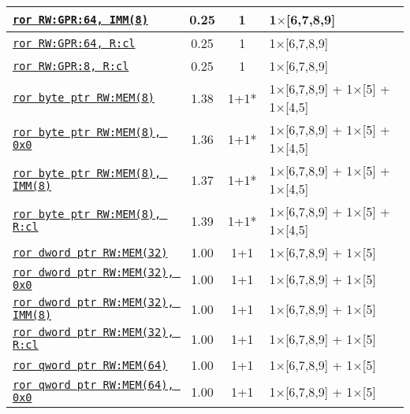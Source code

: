 \documentclass[a4paper,english,fontsize=9]{scrartcl}
\begin{document}
\begin{longtable}{p{}ccL{.25\textwidth}}
  \midrule
  \texttt{\href{https://felixcloutier.com/x86/RCL:RCR:ROL:ROR.html}{ror RW:GPR:64, IMM(8)}} & 0.25 & 1 & 1\(\times\)[6,7,8,9] \\
  \midrule
  \texttt{\href{https://felixcloutier.com/x86/RCL:RCR:ROL:ROR.html}{ror RW:GPR:64, R:cl}} & 0.25 & 1 & 1\(\times\)[6,7,8,9] \\
  \midrule
  \texttt{\href{https://felixcloutier.com/x86/RCL:RCR:ROL:ROR.html}{ror RW:GPR:8, R:cl}} & 0.25 & 1 & 1\(\times\)[6,7,8,9] \\
  \midrule
  \texttt{\href{https://felixcloutier.com/x86/RCL:RCR:ROL:ROR.html}{ror byte ptr RW:MEM(8)}} & 1.38 & 1+1* & 1\(\times\)[6,7,8,9] + 1\(\times\)[5] + 1\(\times\)[4,5] \\
  \midrule
  \texttt{\href{https://felixcloutier.com/x86/RCL:RCR:ROL:ROR.html}{ror byte ptr RW:MEM(8), 0x0}} & 1.36 & 1+1* & 1\(\times\)[6,7,8,9] + 1\(\times\)[5] + 1\(\times\)[4,5] \\
  \midrule
  \texttt{\href{https://felixcloutier.com/x86/RCL:RCR:ROL:ROR.html}{ror byte ptr RW:MEM(8), IMM(8)}} & 1.37 & 1+1* & 1\(\times\)[6,7,8,9] + 1\(\times\)[5] + 1\(\times\)[4,5] \\
  \midrule
  \texttt{\href{https://felixcloutier.com/x86/RCL:RCR:ROL:ROR.html}{ror byte ptr RW:MEM(8), R:cl}} & 1.39 & 1+1* & 1\(\times\)[6,7,8,9] + 1\(\times\)[5] + 1\(\times\)[4,5] \\
  \midrule
  \texttt{\href{https://felixcloutier.com/x86/RCL:RCR:ROL:ROR.html}{ror dword ptr RW:MEM(32)}} & 1.00 & 1+1 & 1\(\times\)[6,7,8,9] + 1\(\times\)[5] \\
  \midrule
  \texttt{\href{https://felixcloutier.com/x86/RCL:RCR:ROL:ROR.html}{ror dword ptr RW:MEM(32), 0x0}} & 1.00 & 1+1 & 1\(\times\)[6,7,8,9] + 1\(\times\)[5] \\
  \midrule
  \texttt{\href{https://felixcloutier.com/x86/RCL:RCR:ROL:ROR.html}{ror dword ptr RW:MEM(32), IMM(8)}} & 1.00 & 1+1 & 1\(\times\)[6,7,8,9] + 1\(\times\)[5] \\
  \midrule
  \texttt{\href{https://felixcloutier.com/x86/RCL:RCR:ROL:ROR.html}{ror dword ptr RW:MEM(32), R:cl}} & 1.00 & 1+1 & 1\(\times\)[6,7,8,9] + 1\(\times\)[5] \\
  \midrule
  \texttt{\href{https://felixcloutier.com/x86/RCL:RCR:ROL:ROR.html}{ror qword ptr RW:MEM(64)}} & 1.00 & 1+1 & 1\(\times\)[6,7,8,9] + 1\(\times\)[5] \\
  \midrule
  \texttt{\href{https://felixcloutier.com/x86/RCL:RCR:ROL:ROR.html}{ror qword ptr RW:MEM(64), 0x0}} & 1.00 & 1+1 & 1\(\times\)[6,7,8,9] + 1\(\times\)[5] \\

\end{longtable}
\end{document}
